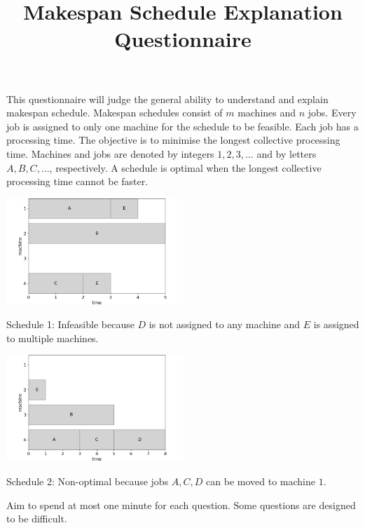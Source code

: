 \documentclass[10pt,a4paper]{article}
\title{Makespan Schedule Explanation Questionnaire}
\date{}
\author{}
\begin{document}
\maketitle
\vspace{-4\baselineskip}
\noindent\hrulefill

This questionnaire will judge the general ability to understand and explain makespan schedule. Makespan schedules consist of $m$ machines and $n $ jobs. Every job is assigned to only one machine for the schedule to be feasible. Each job has a processing time. The objective is to minimise the longest collective processing time. Machines and jobs are denoted by integers $1,2,3,...$ and by letters $A,B,C,...$, respectively. A schedule is optimal when the longest collective processing time cannot be faster.

\begin{multicols}{2}
	\includegraphics[width=0.5\textwidth]{figures/makespan_infeasible}
	\begin{center}
		Schedule 1: Infeasible because $D$ is not assigned to any machine and $E$ is assigned to multiple machines.
	\end{center}
	\includegraphics[width=0.5\textwidth]{figures/makespan_unoptimal}
	\begin{center}
		Schedule 2: Non-optimal because jobs $A,C,D$ can be moved to machine $1$.
	\end{center}
\end{multicols}

\vspace{-\baselineskip}
\noindent\hrulefill

Aim to spend at most one minute for each question. Some questions are designed to be difficult.
\end{document}
